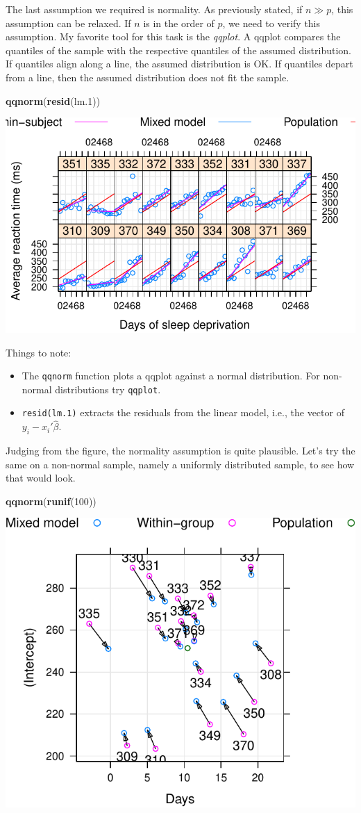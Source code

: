 \documentclass[]{book}
\newenvironment{Shaded}{\begin{snugshade}}{\end{snugshade}}
\newcommand{\DecValTok}[1]{\textcolor[rgb]{0.00,0.00,0.81}{#1}}
\newcommand{\FloatTok}[1]{\textcolor[rgb]{0.00,0.00,0.81}{#1}}
\newcommand{\KeywordTok}[1]{\textcolor[rgb]{0.13,0.29,0.53}{\textbf{#1}}}
\newcommand{\NormalTok}[1]{#1}
\providecommand{\tightlist}{%
  \setlength{\itemsep}{0pt}\setlength{\parskip}{0pt}}
\theoremstyle{definition}
\theoremstyle{definition}
\theoremstyle{definition}
\theoremstyle{remark}
\begin{document}
The last assumption we required is normality.
As previously stated, if \(n \gg p\), this assumption can be relaxed.
If \(n\) is in the order of \(p\), we need to verify this assumption.
My favorite tool for this task is the \emph{qqplot}.
A qqplot compares the quantiles of the sample with the respective quantiles of the assumed distribution.
If quantiles align along a line, the assumed distribution is OK.
If quantiles depart from a line, then the assumed distribution does not fit the sample.

\begin{Shaded}
\begin{Highlighting}[]
\KeywordTok{qqnorm}\NormalTok{(}\KeywordTok{resid}\NormalTok{(lm}\FloatTok{.1}\NormalTok{))}
\end{Highlighting}
\end{Shaded}

\includegraphics[width=0.5\linewidth]{Rcourse_files/figure-latex/unnamed-chunk-163-1}

Things to note:

\begin{itemize}
\tightlist
\item
  The \texttt{qqnorm} function plots a qqplot against a normal distribution. For non-normal distributions try \texttt{qqplot}.
\item
  \texttt{resid(lm.1)} extracts the residuals from the linear model, i.e., the vector of \(y_i-x_i'\hat \beta\).
\end{itemize}

Judging from the figure, the normality assumption is quite plausible.
Let's try the same on a non-normal sample, namely a uniformly distributed sample, to see how that would look.

\begin{Shaded}
\begin{Highlighting}[]
\KeywordTok{qqnorm}\NormalTok{(}\KeywordTok{runif}\NormalTok{(}\DecValTok{100}\NormalTok{))}
\end{Highlighting}
\end{Shaded}

\includegraphics[width=0.5\linewidth]{Rcourse_files/figure-latex/unnamed-chunk-164-1}
\end{document}
